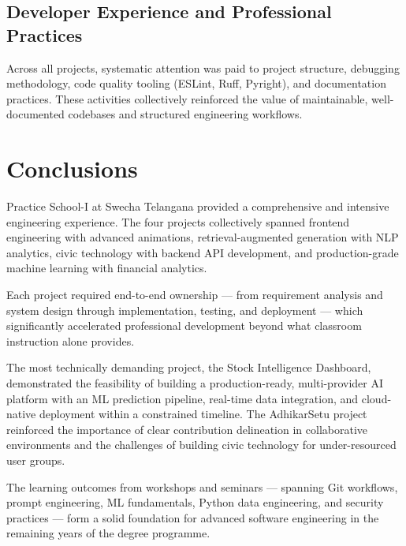 \documentclass{book}
\begin{document}
\section{Developer Experience and Professional Practices}

\par\noindent Across all projects, systematic attention was paid to project structure, debugging methodology, code quality tooling (ESLint, Ruff, Pyright), and documentation practices. These activities collectively reinforced the value of maintainable, well-documented codebases and structured engineering workflows.

\chapter{Conclusions}

\par\noindent Practice School-I at Swecha Telangana provided a comprehensive and intensive engineering experience. The four projects collectively spanned frontend engineering with advanced animations, retrieval-augmented generation with NLP analytics, civic technology with backend API development, and production-grade machine learning with financial analytics.

\par\noindent Each project required end-to-end ownership --- from requirement analysis and system design through implementation, testing, and deployment --- which significantly accelerated professional development beyond what classroom instruction alone provides.

\par\noindent The most technically demanding project, the Stock Intelligence Dashboard, demonstrated the feasibility of building a production-ready, multi-provider AI platform with an ML prediction pipeline, real-time data integration, and cloud-native deployment within a constrained timeline. The AdhikarSetu project reinforced the importance of clear contribution delineation in collaborative environments and the challenges of building civic technology for under-resourced user groups.

\par\noindent The learning outcomes from workshops and seminars --- spanning Git workflows, prompt engineering, ML fundamentals, Python data engineering, and security practices --- form a solid foundation for advanced software engineering in the remaining years of the degree programme.
\end{document}
